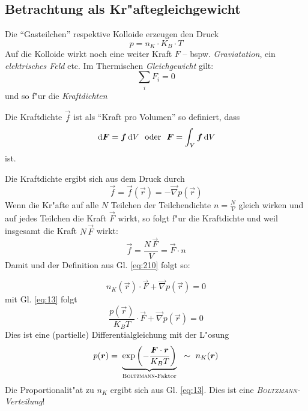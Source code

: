 \subsection{Betrachtung als Kr"aftegleichgewicht}
\label{kap_betrachtung-als-kraftegleichgewicht}


Die "`Gasteilchen"' respektive Kolloide erzeugen den Druck
\begin{equation}
   \label{eq:13}
   p = n_K \cdot K_B \cdot T
\end{equation}
%
Auf die Kolloide wirkt noch eine weiter Kraft $F$ --
bspw. \emph{Graviatation}, ein \emph{elektrisches Feld} etc. Im
Thermischen \emph{Gleichgewicht} gilt:
$$
 \sum_i F_i = 0
$$
und so f"ur die \emph{Kraftdichten} 
\begin{Def}
    Die Kraftdichte $\vec f$ ist als "`Kraft pro
   Volumen"' so definiert, dass 
   \begin{equation}
      \label{eq:210}
\diff \vec F = \vec f \diff V ~ \text{ oder } ~ \vec F = \int_V \vec f \diff V
   \end{equation}
 ist.
\end{Def}
Die Kraftdichte ergibt sich aus dem Druck durch
\begin{equation}
   \label{eq:208}
   \vec f = \vec f(\vec r) = - \vec \nabla p(\vec r)
\end{equation}
Wenn die Kr"afte auf alle $N$ Teilchen der Teilchendichte $n = \frac{N}{V}$ gleich
wirken  und auf jedes Teilchen  die Kraft $\vec F$ wirkt, so folgt f"ur die
Kraftdichte und weil insgesamt die Kraft $N\, \vec F$ wirkt:
\begin{equation*}
\vec f = \frac{N \, \vec F}{V} = \vec F \cdot n
\end{equation*}
Damit und der Definition aus Gl. \eqref{eq:210} folgt so:

\begin{equation}
   \label{eq:14}
   n_K(\vec r) \cdot \vec F + \Vec \nabla p(\vec r) = 0
\end{equation}
mit Gl. \eqref{eq:13} folgt
\begin{equation}
   \label{eq:15}
   \frac{p(\vec r)}{K_B T} \cdot \vec F + \vec \nabla p(\vec r) = 0
\end{equation}
Dies ist eine (partielle) Differentialgleichung mit der L"osung
\begin{equation}
   \label{eq:16}
   p(\vec r) = \underbrace{\exp \left ( - \frac{\vec F \cdot \vec
          r}{K_B T} \right )}_\text{ \textsc{Boltzmann}-Faktor } ~ \sim
   ~ n_K(\vec r)
\end{equation}
Die Proportionalit"at zu $n_K$ ergibt sich aus Gl. \eqref{eq:13}. Dies
ist eine
\emph{\textsc{Boltzmann}-Verteilung}!

